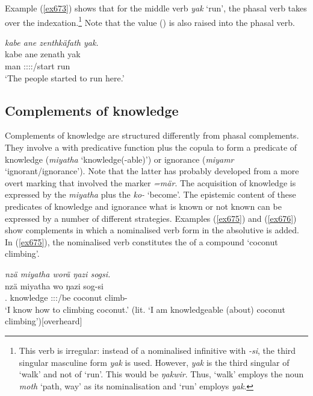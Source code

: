 Example (\ref{ex673}) shows that for the middle verb \emph{yak} `run', the phasal verb takes over the indexation.\footnote{This verb is irregular: instead of a nominalised infinitive with \emph{-si}, the third singular masculine form \emph{yak} is used. However, \emph{yak} is the third singular of `walk' and not of `run'. This would be \emph{ŋakwir}. Thus, `walk' employs the noun \emph{moth} `path, way' as its nominalisation and `run' employs \emph{yak}.} Note that the  value (\Venit) is also raised into the phasal verb.

\begin{exe}
	\ex \emph{kabe ane zenthkäfath yak.}\\
	\gll kabe ane zenath yak\\
	man {\Dem} \Stpl:\Sbj:\Pst:\Pfv:\Venit/start run\\
	\trans `The people started to run here.'
	\label{ex673}
\end{exe}

\subsection{Complements of knowledge}\label{complknow}

Complements of knowledge are structured differently from phasal complements. They involve a  with predicative function plus the copula to form a predicate of knowledge (\emph{miyatha} `knowledge(-able)') or ignorance (\emph{miyamr} `ignorant/ignorance'). Note that the latter has probably developed from a more overt marking that involved the   marker \emph{=mär}. The acquisition of knowledge is expressed by the  \emph{miyatha} plus the  \emph{ko-} `become'. The epistemic content of these predicates of knowledge and ignorance \textendash{} what is known or not known \textendash{} can be expressed by a number of different strategies. Examples (\ref{ex675}) and (\ref{ex676}) show complements in which a nominalised verb form in the absolutive is added. In (\ref{ex675}), the nominalised verb constitutes the  of a compound `coconut climbing'.

\begin{exe}
	\ex \emph{nzä miyatha worä ŋazi sogsi.}\\
	\gll nzä miyatha wo ŋazi sog-si\\
	\Fsg.{\Abs} knowledge \Fsg:\Sbj:\Nonpast:\Ipfv/be coconut climb-{\Nmlz}\\
	\trans `I know how to climbing coconut.' (lit. `I am knowledgeable (about) coconut climbing'){\hspace*{1pt}\hfill{\footnotesize{[overheard]}}}
	\label{ex675}
\end{exe}

